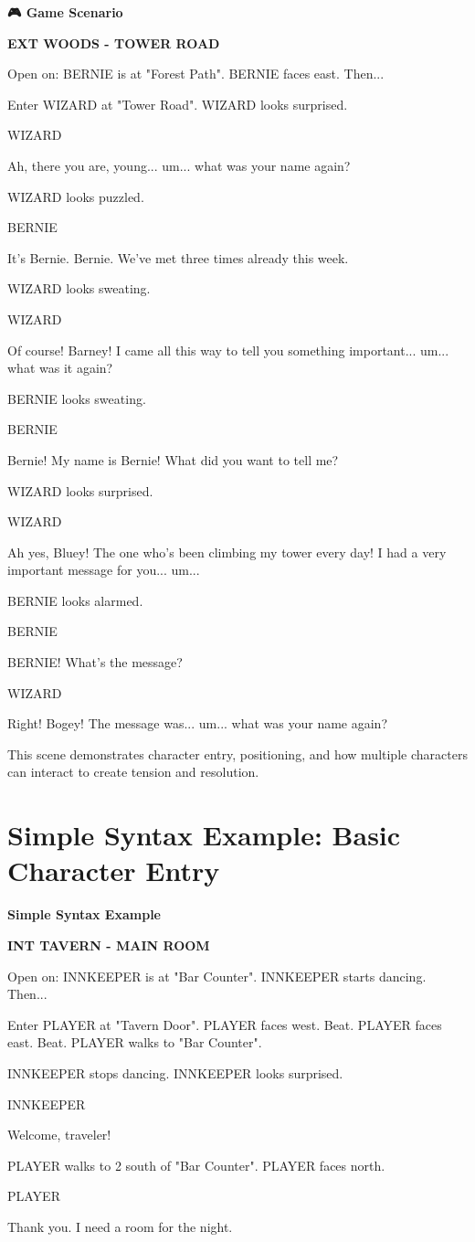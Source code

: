 \documentclass[11pt,letterpaper,oldstylefigures]{memoir}
\newcommand{\slugline}[1]{\nobreak\textbf{\MakeUppercase{#1}}\par\nobreak\vspace{1\baselineskip}}
\newcommand{\speaker}[1]{\nobreak\hspace*{0.333\textwidth}\MakeUppercase{#1}\par\nobreak\vspace{0.5\baselineskip}}
\newcommand{\dialogue}[1]{\nobreak\hspace*{0.25\textwidth}\begin{minipage}{0.5\textwidth}#1\end{minipage}\par\vspace{1\baselineskip}}
\newcommand{\stagedir}[1]{#1\par\vspace{1\baselineskip}}
\newenvironment{FountainExample}
  {\begingroup
  \ttfamily\small
   \setlength{\parindent}{0pt}
  \setlength{\parskip}{0.5em}
  \allowdisplaybreaks
  \setlength{\displaywidowpenalty}{0}
  \setlength{\widowpenalty}{0}
  \setlength{\clubpenalty}{0}
  \setlength{\interlinepenalty}{0}
}
  {\endgroup}
\newenvironment{SimpleExample}
{\begingroup
\small
\setlength{\parindent}{0pt}
\setlength{\parskip}{0.5em}
\allowdisplaybreaks
\setlength{\displaywidowpenalty}{0}
\setlength{\widowpenalty}{0}
\setlength{\clubpenalty}{0}
\setlength{\interlinepenalty}{0}
\begin{tcolorbox}[
    colback=blue!5,
    colframe=blue!75!black,
    boxrule=0.5pt,
    arc=2pt,
    left=0.5em,
    right=0.5em,
    top=0.25em,
    bottom=0.25em
]
\textbf{Simple Syntax Example}
\end{tcolorbox}\par
}
{\endgroup}
\newenvironment{GameScenario}
{\begingroup
\small
\setlength{\parindent}{0pt}
\setlength{\parskip}{0.5em}
\allowdisplaybreaks
\setlength{\displaywidowpenalty}{0}
\setlength{\widowpenalty}{0}
\setlength{\clubpenalty}{0}
\setlength{\interlinepenalty}{0}
\begin{tcolorbox}[
    colback=orange!5,
    colframe=orange!75!black,
    boxrule=0.5pt,
    arc=2pt,
    left=0.5em,
    right=0.5em,
    top=0.25em,
    bottom=0.25em
]
\textbf{🎮 Game Scenario}
\end{tcolorbox}\par
}
{\endgroup}
\begin{document}
\begin{GameScenario}
\begin{FountainExample}
\slugline{EXT WOODS - TOWER ROAD}

\stagedir{Open on: BERNIE is at "Forest Path". BERNIE faces east. Then...}
\stagedir{Enter WIZARD at "Tower Road". WIZARD looks surprised.}

\speaker{WIZARD}
\dialogue{Ah, there you are, young... um... what was your name again?}

\stagedir{WIZARD looks puzzled.}

\speaker{BERNIE}
\dialogue{It's Bernie. Bernie. We've met three times already this week.}

\stagedir{WIZARD looks sweating.}

\speaker{WIZARD}
\dialogue{Of course! Barney! I came all this way to tell you something important... um... what was it again?}

\stagedir{BERNIE looks sweating.}

\speaker{BERNIE}
\dialogue{Bernie! My name is Bernie! What did you want to tell me?}

\stagedir{WIZARD looks surprised.}

\speaker{WIZARD}
\dialogue{Ah yes, Bluey! The one who's been climbing my tower every day! I had a very important message for you... um...}

\stagedir{BERNIE looks alarmed.}

\speaker{BERNIE}
\dialogue{BERNIE! What's the message?}

\speaker{WIZARD}
\dialogue{Right! Bogey! The message was... um... what was your name again?}
\end{FountainExample}
\end{GameScenario}

This scene demonstrates character entry, positioning, and how multiple characters can interact to create tension and resolution.

\section{Simple Syntax Example: Basic Character Entry}
\label{sec:character-entry}

\begin{SimpleExample}
\begin{FountainExample}
\slugline{INT TAVERN - MAIN ROOM}

\stagedir{Open on: INNKEEPER is at "Bar Counter". INNKEEPER starts dancing. Then...}
\stagedir{Enter PLAYER at "Tavern Door". PLAYER faces west. Beat. PLAYER faces east. Beat. PLAYER walks to "Bar Counter".}

\stagedir{INNKEEPER stops dancing. INNKEEPER looks surprised.}

\speaker{INNKEEPER}
\dialogue{Welcome, traveler!}

\stagedir{PLAYER walks to 2 south of "Bar Counter". PLAYER faces north.}

\speaker{PLAYER}
\dialogue{Thank you. I need a room for the night.}
\end{FountainExample}
\end{SimpleExample}
\end{document}
